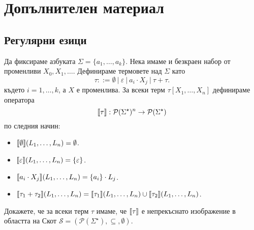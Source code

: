 \section{Допълнителен материал}
\subsection{Регулярни езици}

Да фиксираме азбуката $\Sigma = \{a_1,\dots,a_k\}$.
Нека имаме и безкраен набор от променливи $X_0,X_1,\dots$.
Дефинираме термовете над $\Sigma$ като
\[\tau ::= \emptyset\ |\ \varepsilon\ |\ a_i \cdot X_j\ |\ \tau + \tau.\]
където $i = 1, \dots,k$, а $X$ е променлива.
За всеки терм $\tau[X_1,\dots,X_n]$ дефинираме оператора 
\[\llbracket{\tau}\rrbracket: \mathcal{P}(\Sigma^\star)^n \to \mathcal{P}(\Sigma^\star)\]
 по следния начин:
\begin{itemize}
\item
    $\llbracket{\emptyset}\rrbracket(L_1,\dots,L_n) = \emptyset$.
\item 
  $\llbracket{\varepsilon}\rrbracket(L_1,\dots,L_n) = \{\varepsilon\}$.
\item 
  $\llbracket{a_i \cdot X_j}\rrbracket(L_1,\dots,L_n) = \{a_i\} \cdot L_j$.
\item
  $\llbracket{\tau_1 + \tau_2}\rrbracket(L_1,\dots,L_n) = \llbracket{\tau_1}\rrbracket(L_1,\dots,L_n) \cup \llbracket{\tau_2}\rrbracket(L_1,\dots,L_n)$.
\end{itemize}

\begin{problem}
  Докажете, че за всеки терм $\tau$ имаме, че $\llbracket{\tau}\rrbracket$ е непрекъснато изображение в областта на Скот
  $\mathcal{S} = ( \mathcal{P}(\Sigma^\star),\subseteq, \emptyset)$.
\end{problem}


